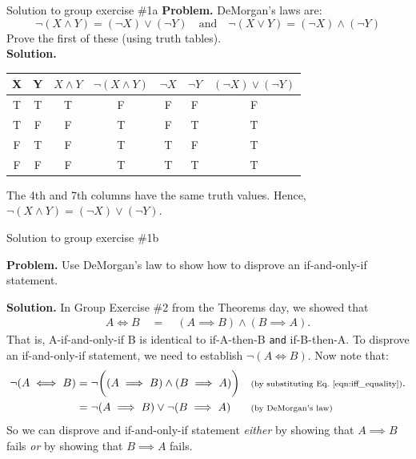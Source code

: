 \documentclass[10pt]{beamer}
\begin{document}
\begin{frame}{Solution to group exercise \#1a}
\textbf{Problem.} DeMorgan's laws are:
	\[ \lnot (X \land Y) = (\lnot X) \lor (\lnot Y) \quad \text{and} \quad \lnot (X \lor Y) = (\lnot X) \land (\lnot Y) \]
	Prove the first of these (using truth tables).  \\
	
\textbf{Solution.} 
\begin{center}
\begin{tabular}{cc|cc|ccc}
X & Y & $X \land Y$ & $ \lnot (X \land Y)$  & $ \lnot X$   & $ \lnot Y$  & $ (\lnot X) \lor (\lnot Y)$  \\
\hline 
T & T & T & F & F & F & F\\
T & F & F &T & F & T & T\\
F & T & F  &T &T & F & T \\
F & F & F  &T  &T & T & T\\
\end{tabular}
\end{center}	

The 4th and 7th columns have the same truth values.  Hence, $ \lnot (X \land Y) = (\lnot X) \lor (\lnot Y)$. 
\end{frame}



\begin{frame}{Solution to group exercise \#1b}
\small 

\textbf{Problem.} 
Use DeMorgan's law to show how to disprove an if-and-only-if statement.


\textbf{Solution.} In Group Exercise \#2 from the Theorems day, we showed that
%
\begin{align}
 A \iff B  \quad  = \quad (A \implies B) \land (B \implies A).
 \label{eqn:iff_equality}
\end{align}
%
That is, A-if-and-only-if B is identical to if-A-then-B \texttt{and} if-B-then-A.
\vfill 
To \alert{disprove} an if-and-only-if statement, we need to establish $\lnot (A \iff B)$.  Now note that:
%
\begin{align*}
\lnot (A \iff B) & = \lnot \bigg((A \implies B) \land (B \implies A)  \bigg) && \scripttext{(by substituting \Eqref{eqn:iff_equality})}. \\
&=  \lnot  (A \implies B) \lor  \lnot (B \implies A)  && \scripttext{(by DeMorgan's law)}
\end{align*}
So we can disprove and if-and-only-if statement \textit{either} by showing that $A \implies B$ fails \textit{or} by showing that $B \implies A$ fails.  

\end{frame}
\end{document}
